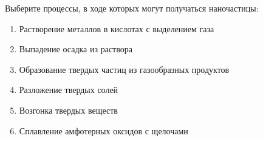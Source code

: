 
Выберите процессы, в ходе
которых могут получаться наночастицы:

\begin{enumerate}
    \item Растворение металлов в кислотах с выделением газа
    \item Выпадение осадка из раствора
    \item Образование твердых частиц из газообразных продуктов
    \item Разложение твердых солей
    \item Возгонка твердых веществ
    \item Сплавление амфотерных оксидов с щелочами
\end{enumerate}



